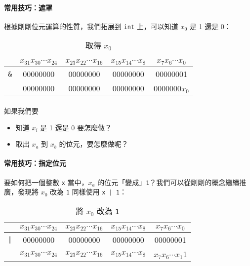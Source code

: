 \documentclass[12pt,a4paper,oneside]{article}
\begin{document}
\begin{CJK}{UTF8}{bkai}
\paragraph{常用技巧：遮罩}根據剛剛位元運算的性質，我們拓展到 \lstinline!int! 上，可以知道 $x_0$ 是 1 還是 0：

\begin{table}[h!]
\centering
\begin{tabular}{|c|c|c|c|c|}
\hline
 & $x_{31}x_{30}\cdots{x_{24}}$ & $x_{23}x_{22}\cdots{x_{16}}$ & $x_{15}x_{14}\cdots{x_{8}}$ & $x_{7}x_{6}\cdots{x_{0}}$\\
\hline
\lstinline!&! & 00000000 & 00000000 & 00000000 & 0000000{\color{red}1}\\
\hline
\hline
 & 00000000 & 00000000 & 00000000 & 0000000\textbf{$x_0$}\\
\hline
\end{tabular}
\caption{取得 $x_0$}
\label{basic:cpp:table:mask}
\end{table}

\paragraph{}如果我們要
\begin{itemize}
\item 知道 $x_i$ 是 1 還是 0 要怎麼做？
\item 取出 $x_a$ 到 $x_b$ 的位元，要怎麼做呢？
\end{itemize}

\paragraph{常用技巧：指定位元}要如何把一個整數 \lstinline!x! 當中，$x_a$ 的位元「變成」\lstinline!1!？我們可以從剛剛的概念繼續推廣，發現將 $x_0$ 改為 \lstinline!1! 同樣使用 \lstinline!x | 1!：

\begin{table}[h!]
\centering
\begin{tabular}{|c|c|c|c|c|}
\hline
 & $x_{31}x_{30}\cdots{x_{24}}$ & $x_{23}x_{22}\cdots{x_{16}}$ & $x_{15}x_{14}\cdots{x_{8}}$ & $x_{7}x_{6}\cdots{x_{0}}$\\
\hline
\lstinline!|! & 00000000 & 00000000 & 00000000 & 0000000{\color{red}1}\\
\hline\hline
 & $x_{31}x_{30}\cdots{x_{24}}$ & $x_{23}x_{22}\cdots{x_{16}}$ & $x_{15}x_{14}\cdots{x_{8}}$ & $x_{7}x_{6}\cdots{x_{1}}${\color{red}1}\\
\hline
\end{tabular}
\caption{將 $x_0$ 改為 \lstinline!1!}
\label{basic:cpp:table:setbit:x0}
\end{table}


\end{CJK}
\end{document}
